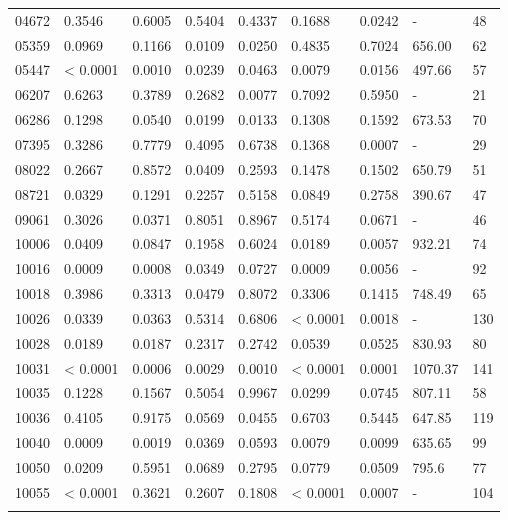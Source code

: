 \begin{table}[H]
{\begin{tabular}{lllllllll}
04672 & 0.3546 & 0.6005 & 0.5404 & 0.4337 & 0.1688 & {\color{red}0.0242} & - & 48 \\
05359 & 0.0969 & 0.1166 & {\color{red}0.0109} & {\color{red}0.0250} & 0.4835 & 0.7024 & 656.00 & 62 \\
05447 & {\color{red} < 0.0001} & {\color{red}0.0010} & {\color{red}0.0239} & {\color{red}0.0463} & {\color{red}0.0079} & {\color{red}0.0156} & 497.66 & 57 \\
06207 & 0.6263 & 0.3789 & 0.2682 & {\color{red}0.0077} & 0.7092 & 0.5950 & - & 21 \\
06286 & 0.1298 & 0.0540 & {\color{red}0.0199} & {\color{red}0.0133} & 0.1308 & 0.1592 & 673.53 & 70 \\
07395 & 0.3286 & 0.7779 & 0.4095 & 0.6738 & 0.1368 & {\color{red}0.0007} & - & 29 \\
08022 & 0.2667 & 0.8572 & {\color{red}0.0409} & 0.2593 & 0.1478 & 0.1502 & 650.79 & 51 \\
08721 & {\color{red}0.0329} & 0.1291 & 0.2257 & 0.5158 & 0.0849 & 0.2758 & 390.67 & 47 \\
09061 & 0.3026 & {\color{red}0.0371} & 0.8051 & 0.8967 & 0.5174 & 0.0671 & - & 46 \\
10006 & {\color{red}0.0409} & 0.0847 & 0.1958 & 0.6024 & {\color{red}0.0189} & {\color{red}0.0057} & 932.21 & 74 \\
10016 & {\color{red}0.0009} & {\color{red}0.0008} & {\color{red}0.0349} & 0.0727 & {\color{red}0.0009} & {\color{red}0.0056} & - & 92 \\
10018 & 0.3986 & 0.3313 & {\color{red}0.0479} & 0.8072 & 0.3306 & 0.1415 & 748.49 & 65 \\
10026 & {\color{red}0.0339} & {\color{red}0.0363} & 0.5314 & 0.6806 & {\color{red} < 0.0001} & {\color{red}0.0018} & - & 130 \\
10028 & {\color{red}0.0189} & {\color{red}0.0187} & 0.2317 & 0.2742 & 0.0539 & 0.0525 & 830.93 & 80 \\
10031 & {\color{red} < 0.0001} & {\color{red}0.0006} & {\color{red}0.0029} & {\color{red}0.0010} & {\color{red} < 0.0001} & {\color{red}0.0001} & 1070.37 & 141 \\
10035 & 0.1228 & 0.1567 & 0.5054 & 0.9967 & {\color{red}0.0299} & 0.0745 & 807.11 & 58 \\
10036 & 0.4105 & 0.9175 & 0.0569 & {\color{red}0.0455} & 0.6703 & 0.5445 & 647.85 & 119 \\
10040 & {\color{red}0.0009} & {\color{red}0.0019} & {\color{red}0.0369} & 0.0593 & {\color{red}0.0079} & {\color{red}0.0099} & 635.65 & 99 \\
10050 & {\color{red}0.0209} & 0.5951 & 0.0689 & 0.2795 & 0.0779 & 0.0509 & 795.6 & 77 \\
10055 & {\color{red} < 0.0001} & 0.3621 & 0.2607 & 0.1808 & {\color{red} < 0.0001} & {\color{red}0.0007} & - & 104 \\ \hline

\label{tab:nosocsII}
\end{tabular}
}
\end{table}

